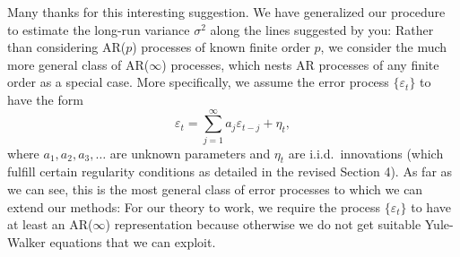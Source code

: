 \documentclass[a4paper,12pt]{article}
\begin{document}
\begin{enumerate}[label=(\arabic*),leftmargin=0.7cm]
Many thanks for this interesting suggestion. We have generalized our procedure to estimate the long-run variance $\sigma^2$ along the lines suggested by you: Rather than considering AR($p$) processes of known finite order $p$, we consider the much more general class of AR($\infty$) processes, which nests AR processes of any finite order as a special case. More specifically, we assume the error process $\{\varepsilon_t\}$ to have the form
\begin{equation}\label{AR-inf}
\varepsilon_t = \sum\limits_{j=1}^\infty a_j \varepsilon_{t-j} + \eta_t, \tag{$*$} 
\end{equation}
where $a_1,a_2,a_3,\ldots$ are unknown parameters and $\eta_t$ are i.i.d.\ innovations (which fulfill certain regularity conditions as detailed in the revised Section 4). As far as we can see, this is the most general class of error processes to which we can extend our methods: For our theory to work, we require the process $\{\varepsilon_t\}$ to have at least an AR($\infty$) representation because otherwise we do not get suitable Yule-Walker equations that we can exploit. 


\end{enumerate}
\end{document}
